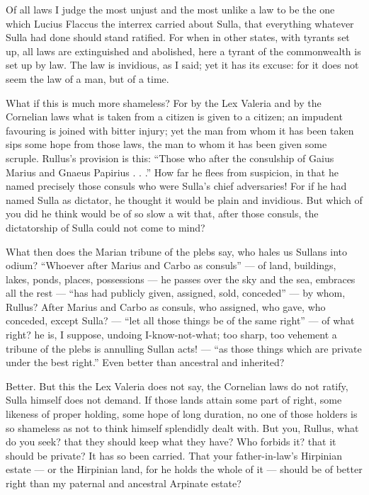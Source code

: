  Of all laws I judge the most unjust and the most unlike a law to be the one which Lucius Flaccus the interrex carried about Sulla, that everything whatever Sulla had done should stand ratified. For when in other states, with tyrants set up, all laws are extinguished and abolished, here a tyrant of the commonwealth is set up by law. The law is invidious, as I said; yet it has its excuse: for it does not seem the law of a man, but of a time.

 What if this is much more shameless? For by the Lex Valeria and by the Cornelian laws what is taken from a citizen is given to a citizen; an impudent favouring is joined with bitter injury; yet the man from whom it has been taken sips some hope from those laws, the man to whom it has been given some scruple. Rullus's provision is this: ``Those who after the consulship of Gaius Marius and Gnaeus Papirius . . .'' How far he flees from suspicion, in that he named precisely those consuls who were Sulla's chief adversaries! For if he had named Sulla as dictator, he thought it would be plain and invidious. But which of you did he think would be of so slow a wit that, after those consuls, the dictatorship of Sulla could not come to mind?

 What then does the Marian tribune of the plebs say, who hales us Sullans into odium? ``Whoever after Marius and Carbo as consuls'' --- of land, buildings, lakes, ponds, places, possessions ---  he passes over the sky and the sea, embraces all the rest --- ``has had publicly given, assigned, sold, conceded'' --- by whom, Rullus? After Marius and Carbo as consuls, who assigned, who gave, who conceded, except Sulla? --- ``let all those things be of the same right'' --- of what right? he is, I suppose, undoing I-know-not-what; too sharp, too vehement a tribune of the plebs is annulling Sullan acts! --- ``as those things which are private under the best right.'' Even better than ancestral and inherited?

 Better. But this the Lex Valeria does not say, the Cornelian laws do not ratify, Sulla himself does not demand. If those lands attain some part of right, some likeness of proper holding, some hope of long duration, no one of those holders is so shameless as not to think himself splendidly dealt with. But you, Rullus, what do you seek? that they should keep what they have? Who forbids it? that it should be private? It has so been carried. That your father-in-law's Hirpinian estate --- or the Hirpinian land, for he holds the whole of it --- should be of better right than my paternal and ancestral Arpinate estate?


